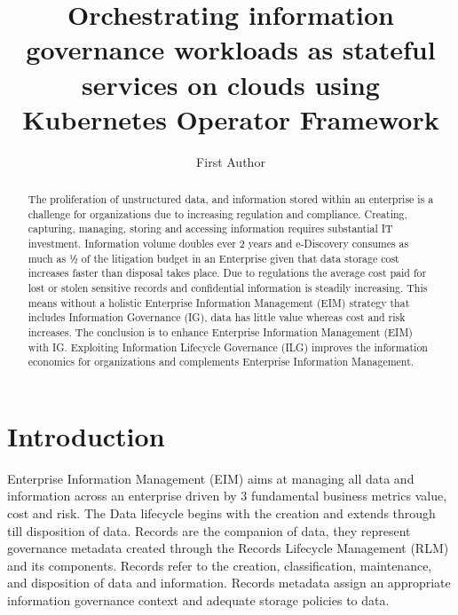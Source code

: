 \documentclass[runningheads]{llncs}
\begin{document}
%
\graphicspath{ {./figs/} }
%
\title{Orchestrating information governance workloads as stateful services on clouds using Kubernetes Operator Framework}
%
%
\author{First Author}
%
%
%
\maketitle              %
%
\begin{abstract}
The proliferation of unstructured data, and information stored within an enterprise is a challenge for organizations due to increasing regulation and compliance. Creating, capturing, managing, storing and accessing information requires substantial IT investment. Information volume doubles ever 2 years and e-Discovery consumes as much as ½ of the litigation budget in an Enterprise given that data storage cost increases faster than disposal takes place. Due to regulations the average cost paid for lost or stolen sensitive records and confidential information is steadily increasing. This means without a holistic Enterprise Information Management (EIM) strategy that includes Information Governance (IG), data has little value whereas cost and risk increases. The conclusion is to enhance Enterprise Information Management (EIM) with IG. Exploiting Information Lifecycle Governance (ILG) improves the information economics for organizations and complements Enterprise Information Management.

\end{abstract}
%
\section{Introduction}

Enterprise Information Management (EIM) aims at managing all data and information across an enterprise driven by 3 fundamental business metrics value, cost and risk. The Data lifecycle begins with the creation and extends through till disposition of data. 
Records are the companion of data, they represent governance metadata created through the Records Lifecycle Management (RLM) and its components. Records refer to the creation, classification, maintenance, and disposition of data and information. Records metadata assign an appropriate information governance context and adequate storage policies to data.
\end{document}
